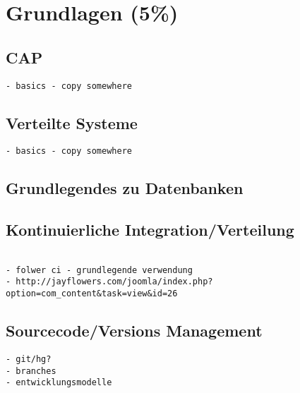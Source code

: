 \chapter{Grundlagen (5\%)}
\section{CAP}

\begin{verbatim}
- basics - copy somewhere
\end{verbatim}

\section{Verteilte Systeme}

\begin{verbatim}
- basics - copy somewhere
\end{verbatim}

\section{Grundlegendes zu Datenbanken}


\section{Kontinuierliche Integration/Verteilung}
\begin{verbatim}

- folwer ci - grundlegende verwendung
- http://jayflowers.com/joomla/index.php?option=com_content&task=view&id=26
\end{verbatim}

\section{Sourcecode/Versions Management}

\begin{verbatim}
- git/hg?
- branches
- entwicklungsmodelle
\end{verbatim}
